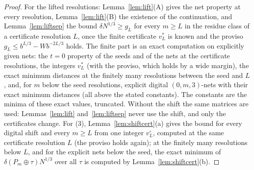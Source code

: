 \documentclass[11pt]{amsart}
\theoremstyle{definition}
\theoremstyle{plain}
\begin{document}
\begin{proof}
For the lifted resolutions: Lemma~\ref{lem:lift}(A) gives the net property at every resolution, Lemma~\ref{lem:lift}(B) the existence of the continuation, and Lemma~\ref{lem:liftsep} the bound $\delta N^{1/3}\ge g_L$ for every $m\ge L$ in the residue class of a certificate resolution $L$, once the finite certificate $v^*_L$ is known and the proviso $g_L\le b^{L/3}-Wb^{-2L/3}$ holds. The finite part is an exact computation on explicitly given nets: the $t=0$ property of the seeds and of the nets at the certificate resolutions, the integers $v^*_L$ (with the proviso, which holds by a wide margin), the exact minimum distances at the finitely many resolutions between the seed and $L$, and, for $m$ below the seed resolutions, explicit digital $(0,m,3)$-nets with their exact minimum distances (all above the stated constants). The constants are the minima of these exact values, truncated. Without the shift the same matrices are used: Lemmas~\ref{lem:lift} and~\ref{lem:liftsep} never use the shift, and only the certificates change. For (3), Lemma~\ref{lem:shiftcert}(a) gives the bound for every digital shift and every $m\ge L$ from one integer $v^\circ_L$, computed at the same certificate resolution $L$ (the proviso holds again); at the finitely many resolutions below $L$, and for the explicit nets below the seed, the exact minimum of $\delta(P_m\oplus\tau)N^{1/3}$ over all $\tau$ is computed by Lemma~\ref{lem:shiftcert}(b).
\end{proof}
\end{document}

